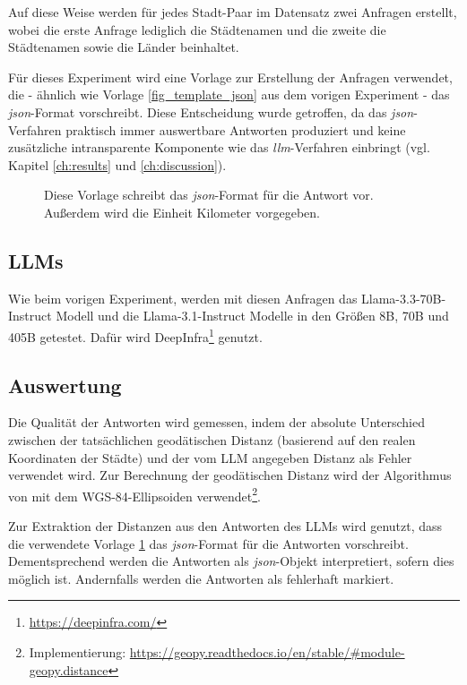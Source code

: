 Auf diese Weise werden für jedes Stadt-Paar im Datensatz zwei Anfragen erstellt, wobei die erste Anfrage lediglich die Städtenamen und die zweite die Städtenamen sowie die Länder beinhaltet.

Für dieses Experiment wird eine Vorlage zur Erstellung der Anfragen verwendet, die - ähnlich wie Vorlage \ref{fig_template_json} aus dem vorigen Experiment - das \textit{json}-Format vorschreibt.
Diese Entscheidung wurde getroffen, da das \textit{json}-Verfahren praktisch immer auswertbare Antworten produziert und keine zusätzliche intransparente Komponente wie das \textit{llm}-Verfahren einbringt (vgl. Kapitel \ref{ch:results} und \ref{ch:discussion}).

\begin{figure}[tb] %
    
    \caption{Diese Vorlage schreibt das \textit{json}-Format für die Antwort vor. Außerdem wird die Einheit Kilometer vorgegeben.}
    \label{fig_template_dist}
\end{figure}

\subsection{LLMs}
Wie beim vorigen Experiment, werden mit diesen Anfragen das Llama-3.3-70B-Instruct Modell und die Llama-3.1-Instruct Modelle in den Größen 8B, 70B und 405B getestet.
Dafür wird DeepInfra\footnote{\url{https://deepinfra.com/}} genutzt.

\subsection{Auswertung}
Die Qualität der Antworten wird gemessen, indem der absolute Unterschied zwischen der tatsächlichen geodätischen Distanz (basierend auf den realen Koordinaten der Städte) und der vom LLM angegeben Distanz als Fehler verwendet wird.
Zur Berechnung der geodätischen Distanz wird der Algorithmus von \citet{karneyAlgorithmsGeodesics2013} mit dem WGS-84-Ellipsoiden verwendet\footnote{Implementierung: \url{https://geopy.readthedocs.io/en/stable/\#module-geopy.distance}}.

Zur Extraktion der Distanzen aus den Antworten des LLMs wird genutzt, dass die verwendete Vorlage \ref{fig_template_dist} das \textit{json}-Format für die Antworten vorschreibt. Dementsprechend werden die Antworten als \textit{json}-Objekt interpretiert, sofern dies möglich ist. Andernfalls werden die Antworten als fehlerhaft markiert.